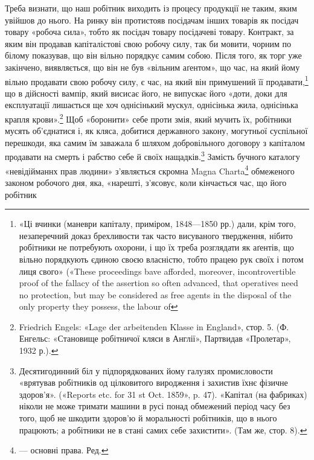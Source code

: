 Треба визнати, що наш робітник виходить із процесу продукції
не таким, яким увійшов до нього. На ринку він протистояв
посідачам інших товарів як посідач товару «робоча сила», тобто
як посідач товару посідачеві товару. Контракт, за яким він продавав
капіталістові свою робочу силу, так би мовити, чорним по
білому показував, що він вільно порядкує самим собою. Після того,
як торг уже закінчено, виявляється, що він не був «вільним
аґентом», що час, на який йому вільно продавати свою робочу
силу, є час, на який він примушений її продавати,\footnote{
«Ці вчинки (маневри капіталу, приміром, 1848—1850 рр.) дали,
крім того, незаперечний доказ брехливости так часто висуваного твердження,
нібито робітники не потребують охорони, і що їх треба розглядати
як аґентів, що вільно порядкують єдиною своєю власністю, тобто
працею рук своїх і потом лиця свого» («These proceedings bave afforded,
moreover, incontrovertible proof of the fallacy of the assertion so often
advanced, that operatives need no protection, but may be considered as
free agents in the disposal of the only property they possess, the labour of
} що в дійсності
вампір, який висисає його, не випускає його «доти, доки для
експлуатації лишається ще хоч однісінький мускул, однісінька
жила, однісінька крапля крови».\footnote{
Friedrich Engels: «Lage der arbeitenden Klasse in England»,
стор. 5. (Ф. Енгельс: «Становище робітничої кляси в Англії», Партвидав
«Пролетар», 1932 р.).
} Щоб «боронити» себе проти
змія, який мучить їх, робітники мусять об’єднатися і, як кляса,
добитися державного закону, могутньої суспільної перешкоди,
яка самим їм заважала б шляхом добровільного договору з капіталом
продавати на смерть і рабство себе й своїх нащадків.\footnote{
Десятигодинний біл у підпорядкованих йому галузях промисловости
«врятував робітників од цілковитого виродження і захистив їхнє
фізичне здоров’я». («Reports etc. for 31 st Oct. 1859», p. 47). «Капітал
(на фабриках) ніколи не може тримати машини в русі понад обмежений
період часу без того, щоб не шкодити здоров’ю й моральності робітників,
що в нього працюють; а робітники не в стані самих себе захистити».
(Там же, стор. 8).
}
Замість бучного каталогу «невідійманнх прав людини» з’являється
скромна Magna Charta\footnote*{
— основні права. Ред.
} обмеженого законом робочого
дня, яка, «нарешті, з’ясовує, коли кінчається час, що його робітник
